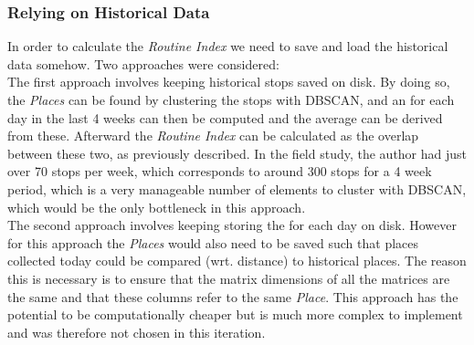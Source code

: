 \subsubsection*{Relying on Historical Data}
In order to calculate the \textit{Routine Index} we need to save and load the historical data somehow. Two approaches were considered:\\

The first approach involves keeping historical stops saved on disk. By doing so, the \textit{Places} can be found by clustering the stops with DBSCAN, and an  for each day in the last 4 weeks can then be computed and the average  can be derived from these. Afterward the \textit{Routine Index} can be calculated as the overlap between these two, as previously described. In the field study, the author had just over 70 stops per week, which corresponds to around 300 stops for a 4 week period, which is a very manageable number of elements to cluster with DBSCAN, which would be the only bottleneck in this approach.\\

The second approach involves keeping storing the  for each day on disk. However for this approach the \textit{Places} would also need to be saved such that places collected today could be compared (wrt. distance) to historical places. The reason this is necessary is to ensure that the matrix dimensions of all the matrices are the same and that these columns refer to the same \textit{Place}.  This approach has the potential to be computationally cheaper but is much more complex to implement and was therefore not chosen in this iteration.
